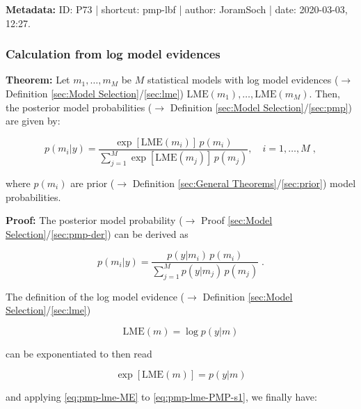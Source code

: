 \documentclass[a4paper,12pt,twoside]{book}
\begin{document}
\vspace{1em}
\textbf{Metadata:} ID: P73 | shortcut: pmp-lbf | author: JoramSoch | date: 2020-03-03, 12:27.
\vspace{1em}



\subsubsection[\textbf{Calculation from log model evidences}]{Calculation from log model evidences} \label{sec:pmp-lme}
\setcounter{equation}{0}

\textbf{Theorem:} Let $m_1, \ldots, m_M$ be $M$ statistical models with log model evidences ($\rightarrow$ Definition \ref{sec:Model Selection}/\ref{sec:lme}) $\mathrm{LME}(m_1), \ldots, \mathrm{LME}(m_M)$. Then, the posterior model probabilities ($\rightarrow$ Definition \ref{sec:Model Selection}/\ref{sec:pmp}) are given by:

\begin{equation} \label{eq:pmp-lme-PMP-LME}
p(m_i|y) = \frac{\exp[\mathrm{LME}(m_i)] \, p(m_i)}{\sum_{j=1}^{M} \exp[\mathrm{LME}(m_j)] \, p(m_j)}, \quad i = 1,\ldots,M \; ,
\end{equation}

where $p(m_i)$ are prior ($\rightarrow$ Definition \ref{sec:General Theorems}/\ref{sec:prior}) model probabilities.


\vspace{1em}
\textbf{Proof:} The posterior model probability ($\rightarrow$ Proof \ref{sec:Model Selection}/\ref{sec:pmp-der}) can be derived as

\begin{equation} \label{eq:pmp-lme-PMP-s1}
p(m_i|y) = \frac{p(y|m_i) \, p(m_i)}{\sum_{j=1}^{M} p(y|m_j) \, p(m_j)} \; .
\end{equation}

The definition of the log model evidence ($\rightarrow$ Definition \ref{sec:Model Selection}/\ref{sec:lme})

\begin{equation} \label{eq:pmp-lme-LME}
\mathrm{LME}(m) = \log p(y|m)
\end{equation}

can be exponentiated to then read

\begin{equation} \label{eq:pmp-lme-ME}
\exp\left[ \mathrm{LME}(m) \right] = p(y|m)
\end{equation}

and applying \eqref{eq:pmp-lme-ME} to \eqref{eq:pmp-lme-PMP-s1}, we finally have:
\end{document}
